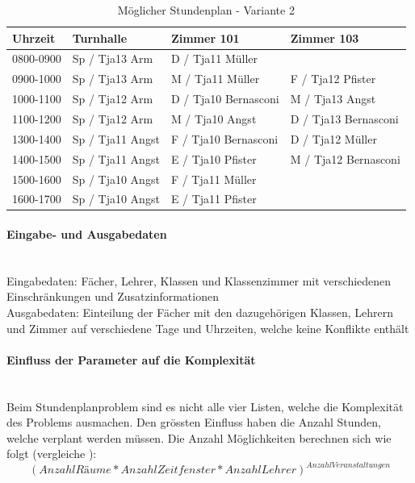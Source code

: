 \begin{table}[ht]
\centering
  \begin{tabular}{ l | p{2.3cm} | p{2.3cm} | p{2.3cm}}
	\hline
	\rowcolor{gray}
	\textbf{Uhrzeit} 	& \textbf{Turnhalle}	& \textbf{Zimmer 101} 	& \textbf{Zimmer 103}	\\ \hline
	0800-0900		& Sp / Tja13 \mbox{Arm}		& D / Tja11 \mbox{Müller}		& 				\\ \hline
	0900-1000		& Sp / Tja13 \mbox{Arm}		& M / Tja11 \mbox{Müller}		& F / Tja12 \mbox{Pfister}		\\ \hline
	1000-1100		& Sp / Tja12 \mbox{Arm}		& D / Tja10 \mbox{Bernasconi}	& M / Tja13 \mbox{Angst}		\\ \hline
	1100-1200		& Sp / Tja12 \mbox{Arm}		& M / Tja10 \mbox{Angst}		& D / Tja13 \mbox{Bernasconi}	\\ \hline \hline
	1300-1400		& Sp / Tja11 \mbox{Angst}	& F / Tja10 \mbox{Bernasconi}	& D / Tja12 \mbox{Müller}		\\ \hline
	1400-1500		& Sp / Tja11 \mbox{Angst}	& E / Tja10 \mbox{Pfister}		& M / Tja12 \mbox{Bernasconi}	\\ \hline
	1500-1600		& Sp / Tja10 \mbox{Angst}	& F / Tja11 \mbox{Müller}		& 				\\ \hline
	1600-1700		& Sp / Tja10 \mbox{Angst}	& E / Tja11 \mbox{Pfister}		& 				\\ \hline
  \end{tabular}
   \caption{Möglicher Stundenplan - Variante 2}\label{table:timetable_2}
\end{table}

\FloatBarrier

	\paragraph{Eingabe- und Ausgabedaten}\mbox{}\\
	Eingabedaten: Fächer, Lehrer, Klassen und Klassenzimmer mit verschiedenen Einschränkungen und Zusatzinformationen\\
	Ausgabedaten: Einteilung der Fächer mit den dazugehörigen Klassen, Lehrern und Zimmer auf verschiedene Tage und Uhrzeiten, welche keine Konflikte enthält

	\paragraph{Einfluss der Parameter auf die Komplexität}\mbox{}\\
	Beim Stundenplanproblem sind es nicht alle vier Listen, welche die Komplexität des Problems ausmachen. Den grössten Einfluss haben die Anzahl Stunden, welche verplant werden 
	müssen. Die Anzahl Möglichkeiten berechnen sich wie folgt (vergleiche \cite{scheduling_komplex}): 
	\[(Anzahl Räume * Anzahl Zeitfenster * Anzahl Lehrer)^{Anzahl Veranstaltungen}\]

